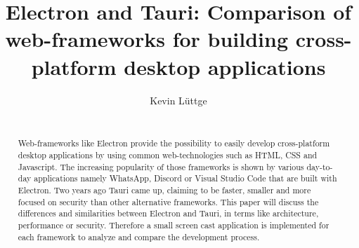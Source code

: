 \documentclass{acm_proc_article-sp}
\date{\displaydate{date}}
\begin{document}
    \title{{\ttlit Electron} and {\ttlit Tauri}: Comparison of web-frameworks for building cross-platform desktop applications}
    \author{
        \alignauthor
        Kevin L\"uttge \\
        \\
    }

    \maketitle

    \begin{abstract}
        Web-frameworks like Electron provide the possibility to easily develop cross-platform desktop applications by using common web-technologies
        such as HTML, CSS and Javascript.
        The increasing popularity of those frameworks is shown by various day-to-day applications namely WhatsApp, Discord or Visual Studio Code
        that are built with Electron.
        Two years ago Tauri came up, claiming to be faster, smaller and more focused on security than other alternative frameworks.
        This paper will discuss the differences and similarities between Electron and Tauri, in terms like architecture, performance or security.
        Therefore a small screen cast application is implemented for each framework to analyze and compare the development process.
    \end{abstract}

    
    
    
    
    
    

    \newpage

    
    

    \balancecolumns
\end{document}
